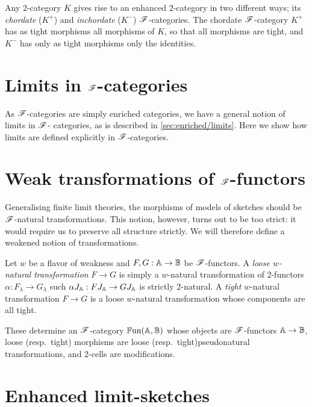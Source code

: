 \documentclass[../thesis.tex]{subfiles}
\begin{document}
  Any 2-category $K$ gives rise to an enhanced 2-category in two different ways; its \emph{chordate}
  ($K^+$) and \emph{inchordate} ($K^-$) ${\mathscr{F}}$-categories. The chordate ${\mathscr{F}}$-category $K^+$ has as
  tight morphisms all morphisms of $K$, so that all morphisms are tight, and $K^-$ has only as tight
  morphisms only the identities.

  \section{Limits in \texorpdfstring{${\mathscr{F}}$}{F}-categories}
  As ${\mathscr{F}}$-categories are simply enriched categories, we have a general notion of limits in ${\mathscr{F}}$-%
  categories, as is described in \cref{sec:enriched/limits}. Here we show how limits are defined
  explicitly in ${\mathscr{F}}$-categories.


  \section{Weak transformations of \texorpdfstring{${\mathscr{F}}$}{F}-functors}
  \newcommand{\bFun}{{\mathbb{F}\mathrm{un}}}
  Generalising finite limit theories, the morphisms of models of sketches should be ${\mathscr{F}}$-natural
  transformations. This notion, however, turns out to be too strict: it would require us to
  preserve all structure strictly. We will therefore define a weakened notion of transformations.
  \begin{definition}
    Let $w$ be a flavor of weakness and $F, G : {\mathbb{A}} \to {\mathbb{B}}$ be ${\mathscr{F}}$-functors. A \emph{loose $w$-%
    natural transformation} $F \to G$ is simply a $w$-natural transformation of 2-functors $\alpha
    : F_\lambda \to G_\lambda$ such $\alpha J_{\mathbb{A}} : F J_{\mathbb{A}} \to G J_{\mathbb{A}}$ is strictly 2-natural. A
    \emph{tight} $w$-natural transformation $F \to G$ is a loose $w$-natural transformation
    whose components are all tight.

    These determine an ${\mathscr{F}}$-category $\bFun(\bA,\bB)$ whose objects are ${\mathscr{F}}$-functors ${\mathbb{A}} \to
    {\mathbb{B}}$, loose (resp.\ tight) morphisms are loose (resp.\ tight)pseudonatural transformations,
    and 2-cells are modifications. 
  \end{definition}
  \begin{remark}
  \end{remark}

  \section{Enhanced limit-sketches}
\end{document}

